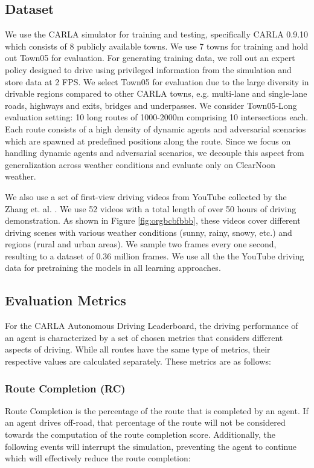 \documentclass[letterpaper, 12pt]{book}
\theoremstyle{definition}
\theoremstyle{definition}
\theoremstyle{definition}
\theoremstyle{definition}
\theoremstyle{definition}
\begin{document}
\subsection{Dataset \label{org9b7d054}}
\label{sec:org5d0a4bd}
We use the CARLA \cite{Dosovitskiy2017} simulator for training and testing,
specifically CARLA 0.9.10 which consists of 8 publicly available towns. We use 7
towns for training and hold out Town05 for evaluation. For generating training
data, we roll out an expert policy designed to drive using privileged
information from the simulation and store data at 2 FPS. We select Town05 for
evaluation due to the large diversity in drivable regions compared to other
CARLA towns, e.g. multi-lane and single-lane roads, highways and exits, bridges
and underpasses. We consider Town05-Long evaluation setting: 10 long routes of
1000-2000m comprising 10 intersections each. Each route consists of a high
density of dynamic agents and adversarial scenarios which are spawned at
predefined positions along the route. Since we focus on handling dynamic agents
and adversarial scenarios, we decouple this aspect from generalization across
weather conditions and evaluate only on ClearNoon weather.

We also use a set of first-view driving videos from YouTube collected by the
Zhang et. al. \cite{Zhang2022}. We use 52 videos with a total length of over 50
hours of driving demonstration. As shown in Figure \ref{fig:orgbcbfbbb}, these videos
cover different driving scenes with various weather conditions (sunny, rainy,
snowy, etc.) and regions (rural and urban areas). We sample two frames every one
second, resulting to a dataset of 0.36 million frames. We use all the the
YouTube driving data for pretraining the models in all learning approaches.

\subsection{Evaluation Metrics \label{orge7e1754}}
\label{sec:org6df9562}
For the CARLA Autonomous Driving Leaderboard, the driving performance of an
agent is characterized by a set of chosen metrics that considers different
aspects of driving. While all routes have the same type of metrics, their
respective values are calculated separately. These metrics are as follows:

\subsubsection{Route Completion (RC)}
\label{sec:orga4b2115}
Route Completion is the percentage of the route that is completed by an
agent. If an agent drives off-road, that percentage of the route will not be
considered towards the computation of the route completion score. Additionally,
the following events will interrupt the simulation, preventing the agent to
continue which will effectively reduce the route completion:
\end{document}
